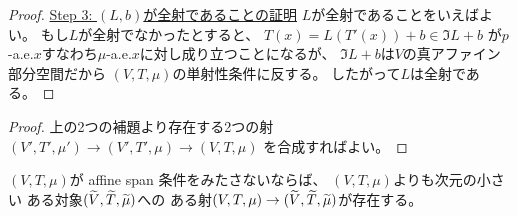 \documentclass[report]{jlreq}
\begin{document}
\begin{proof}
    \uline{Step 3: $(L, b)$が全射であることの証明} \quad
    $L$が全射であることをいえばよい。
    もし$L$が全射でなかったとすると、
    $T(x) = L(T'(x)) + b \in \Im L + b$
    が$p$-a.e.$x$すなわち$\mu$-a.e.$x$に対し成り立つことになるが、
    $\Im L + b$は$V$の真アファイン部分空間だから
    $(V, T, \mu)$の単射性条件に反する。
    したがって$L$は全射である。
\end{proof}


\begin{proof}
    上の2つの補題より存在する2つの射
    $(V', T', \mu') \to (V', T', \mu) \to (V, T, \mu)$
    を合成すればよい。
\end{proof}

\begin{lemma}
    $(V, T, \mu)$が affine span 条件をみたさないならば、
    $(V, T, \mu)$よりも次元の小さい
    ある対象$(\widetilde{V}, \widetilde{T}, \widetilde{\mu})$への
    ある射$(V, T, \mu) \to (\widetilde{V}, \widetilde{T}, \widetilde{\mu})$が存在する。
\end{lemma}
\end{document}

